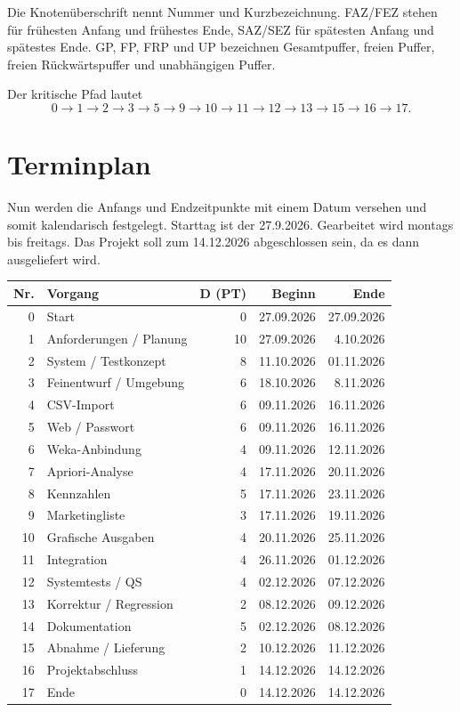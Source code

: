 \documentclass[a4paper,10pt]{article}
\begin{document}
Die Knotenüberschrift nennt Nummer und Kurzbezeichnung. FAZ/FEZ stehen für frühesten Anfang und frühestes Ende, SAZ/SEZ für spätesten Anfang und spätestes Ende. GP, FP, FRP und UP bezeichnen Gesamtpuffer, freien Puffer, freien Rückwärtspuffer und unabhängigen Puffer.

Der kritische Pfad lautet
\[
0\rightarrow1\rightarrow2\rightarrow3\rightarrow5\rightarrow9\rightarrow10
\rightarrow11\rightarrow12\rightarrow13\rightarrow15\rightarrow16\rightarrow17.
\]


\section*{Terminplan}
Nun werden die Anfangs und Endzeitpunkte mit einem Datum versehen und somit kalendarisch festgelegt.
Starttag ist  der 27.9.2026. Gearbeitet wird montags bis freitags. Das Projekt soll zum 14.12.2026 abgeschlossen sein, da es dann ausgeliefert wird.

\begin{center}
\begin{tabularx}{\linewidth}{rYrrr}
\toprule\textbf{Nr.}&\textbf{Vorgang}&\textbf{D (PT)}&\textbf{Beginn}&\textbf{Ende}\\ & Start & 0 & 27.09.2026 & 27.09.2026\\
1 & Anforderungen / Planung & 10 & 27.09.2026 & 4.10.2026\\
2 & System / Testkonzept & 8 & 11.10.2026 & 01.11.2026\\
3 & Feinentwurf / Umgebung & 6 & 18.10.2026 & 8.11.2026\\
4 & CSV-Import & 6 & 09.11.2026 & 16.11.2026\\
5 & Web / Passwort & 6 & 09.11.2026 & 16.11.2026\\
6 & Weka-Anbindung & 4 & 09.11.2026 & 12.11.2026\\
7 & Apriori-Analyse & 4 & 17.11.2026 & 20.11.2026\\
8 & Kennzahlen & 5 & 17.11.2026 & 23.11.2026\\
9 & Marketingliste & 3 & 17.11.2026 & 19.11.2026\\
10 & Grafische Ausgaben & 4 & 20.11.2026 & 25.11.2026\\
11 & Integration & 4 & 26.11.2026 & 01.12.2026\\
12 & Systemtests / QS & 4 & 02.12.2026 & 07.12.2026\\
13 & Korrektur / Regression & 2 & 08.12.2026 & 09.12.2026\\
14 & Dokumentation & 5 & 02.12.2026 & 08.12.2026\\
15 & Abnahme / Lieferung & 2 & 10.12.2026 & 11.12.2026\\
16 & Projektabschluss & 1 & 14.12.2026 & 14.12.2026\\
17 & Ende & 0 & 14.12.2026 & 14.12.2026\\
\bottomrule\end{tabularx}\end{center}
\end{document}
